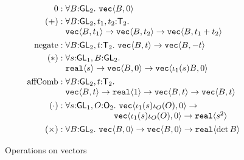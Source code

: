 \documentclass{sigplanconf}
\newcommand{\SynGL}[1]{\mathsf{GL}_#1}
\newcommand{\SynOrth}[1]{\mathsf{O}_#1}
\newcommand{\SynTransl}[1]{\mathsf{T}_#1}
\newcommand{\tyPrim}[2]{\textup{\texttt{#1}}\langle #2 \rangle}
\theoremstyle{examplestyle}
\theoremstyle{restatementstyle}
\begin{document}
\begin{figure}[t]
  \centering
  \begin{align*}
    0 & : \forall B \mathord: \SynGL{2}.\ \tyPrim{vec}{B,0} \\
    (+) & :
    \begin{array}[t]{@{}l}
      \forall B \mathord: \SynGL{2}, t_1,t_2 \mathord: \SynTransl{2}. \\
      \tyPrim{vec}{B,t_1} \to \tyPrim{vec}{B,t_2} \to
      \tyPrim{vec}{B,t_1 + t_2}
    \end{array}
    \\
    \mathrm{negate} & : \forall B \mathord: \SynGL{2}, t \mathord: \SynTransl{2}.\ \tyPrim{vec}{B,t} \to \tyPrim{vec}{B,-t} \\
  (*) & : 
  \begin{array}[t]{@{}l}
    \forall s \mathord: \SynGL{1}, B \mathord:\SynGL{2}.\ \\
    \tyPrim{real}{s} \to \tyPrim{vec}{B,0} \to \tyPrim{vec}{\iota_1(s)B,0}
  \end{array}\\
    \mathrm{affComb} &:
    \begin{array}[t]{@{}l}\forall B \mathord: \SynGL{2}, t \mathord:
    \SynTransl{2}.\\ \tyPrim{vec}{B,t} \to \tyPrim{real}{1} \to
    \tyPrim{vec}{B,t} \to \tyPrim{vec}{B,t}
    \end{array} \\
    (\cdot) & :
\begin{array}[t]{@{}l}
    \forall s \mathord: \SynGL{1}, O \mathord: \SynOrth{2}.\ \tyPrim{vec}{\iota_1(s)\iota_O(O),0} \to\\
    \hspace{2cm}\tyPrim{vec}{\iota_1(s)\iota_O(O),0}\to \tyPrim{real}{s^2}
\end{array}\\
  (\times) & : \forall B \mathord: \SynGL{2}.\ \tyPrim{vec}{B,0} \to
  \tyPrim{vec}{B,0} \to \tyPrim{real}{\det B} 
\end{align*}
  \caption{Operations on vectors}
  \label{fig:vec-ops}
\end{figure}



\newcommand{\Gen}{\mathrm{Gen}}
\newcommand{\Free}{\mathrm{Free}}
\newcommand{\semSort}[1]{\llbracket #1 \rrbracket}
\newcommand{\semIndexExp}[1]{\llbracket #1 \rrbracket}
\newcommand{\semPrimType}[1]{\llbracket #1 \rrbracket}
\newcommand{\opsCtxt}{\Gamma_{\mathit{ops}}}
\newcommand{\opsEnv}{\eta_{\mathit{ops}}}
\newcommand{\ctxteq}[5]{{#1};{#2}\vdash{#3}\approx{#4}:{#5}}
\newcommand{\semeq}[5]{{#1};{#2}\models{#3}\sim{#4}:{#5}}
\end{document}
